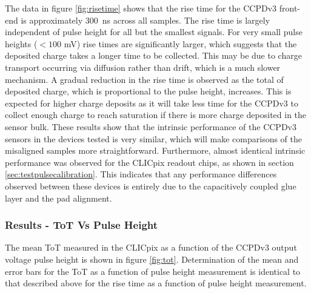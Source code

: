 The data in figure \ref{fig:risetime} shows that the rise time for the CCPDv3 front-end is approximately 300~ns across all samples.  The rise time is largely independent of pulse height for all but the smallest signals.  For very small pulse heights ($< 100$ mV) rise times are significantly larger, which suggests that the deposited charge takes a longer time to be collected.  This may be due to charge transport occurring via diffusion rather than drift, which is a much slower mechanism.  A gradual reduction in the rise time is observed as the total of deposited charge, which is proportional to the pulse height, increases.  This is expected for higher charge deposits as it will take less time for the CCPDv3 to collect enough charge to reach saturation if there is more charge deposited in the sensor bulk.  These results show that the intrinsic performance of the CCPDv3 sensors in the devices tested is very similar, which will make comparisons of the misaligned samples more straightforward.  Furthermore, almost identical intrinsic performance was observed for the CLICpix readout chips, as shown in section \ref{sec:testpulsecalibration}.  This indicates that any performance differences observed between these devices is entirely due to the capacitively coupled glue layer and the pad alignment.    


\subsubsection{Results - ToT Vs Pulse Height}
\label{sec:resultstotpulseheight}
The mean ToT measured in the CLICpix as a function of the CCPDv3 output voltage pulse height is shown in figure \ref{fig:tot}.  Determination of the mean and error bars for the ToT as a function of pulse height measurement is identical to that described above for the rise time as a function of pulse height measurement.   

